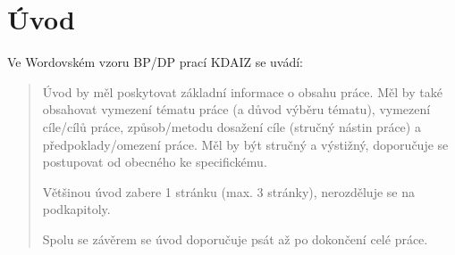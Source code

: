 \chapter*{Úvod}

Ve Wordovském vzoru BP/DP prací KDAIZ se uvádí:
\begin{quote}
    Úvod by měl poskytovat základní informace o obsahu práce. Měl by také obsahovat vymezení tématu práce (a důvod výběru tématu), vymezení cíle/cílů práce, způsob/metodu dosažení cíle (stručný nástin práce) a předpoklady/omezení práce. Měl by být stručný a výstižný, doporučuje se postupovat od obecného ke specifickému.

    Většinou úvod zabere 1 stránku (max. 3 stránky), nerozděluje se na podkapitoly.

    Spolu se závěrem se úvod doporučuje psát až po dokončení celé práce.
\end{quote}

